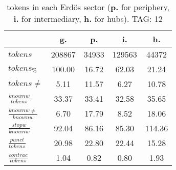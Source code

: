 \begin{table}[h!]
\begin{center}
\begin{tabular}{| l || c | c | c | c |}\hline
 & {\bf g.} & {\bf p.} & {\bf i.} & {\bf h.} \\\hline\hline
$tokens$ & 208867  & 34933  & 129563  & 44372 \\
$tokens_{\%}$ & 100.00  & 16.72  & 62.03  & 21.24 \\
$tokens \neq$ & 5.11  & 11.57  & 6.27  & 10.78 \\\hline
$\frac{knownw}{tokens}$ & 33.37  & 33.41  & 32.58  & 35.65 \\
$\frac{knownw \neq}{knownw}$ & 6.70  & 17.79  & 8.52  & 18.06 \\\hline
$\frac{stopw}{knownw}$ & 92.04  & 86.16  & 85.30  & 114.36 \\
$\frac{punct}{tokens}$ & 20.98  & 22.80  & 22.44  & 15.28 \\
$\frac{contrac}{tokens}$ & 1.04  & 0.82  & 0.80  & 1.93 \\\hline
\end{tabular}
\caption{tokens in each Erd\"os sector ({{\bf p.}} for periphery, {{\bf i.}} for intermediary, 
    {{\bf h.}} for hubs). TAG: 12}
\end{center}
\end{table}